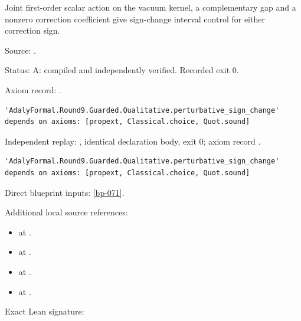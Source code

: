 \begin{theorem}[bp-325]
\label{bp-325}
\leanok
Joint first-order scalar action on the vacuum kernel, a complementary gap and a nonzero correction coefficient give sign-change interval control for either correction sign.

\par Source: \texttt{}.
\par Status: A: compiled and independently verified. Recorded exit 0.
\par Axiom record: \texttt{}.
\begin{verbatim}
'AdalyFormal.Round9.Guarded.Qualitative.perturbative_sign_change' depends on axioms: [propext, Classical.choice, Quot.sound]
\end{verbatim}
\par Independent replay: \texttt{}, identical declaration body, exit 0; axiom record \texttt{}.
\begin{verbatim}
'AdalyFormal.Round9.Guarded.Qualitative.perturbative_sign_change' depends on axioms: [propext, Classical.choice, Quot.sound]
\end{verbatim}
\par Direct blueprint inputs: \ref{bp-071}.
\par Additional local source references:
\begin{itemize}
\item \texttt{} at \texttt{}.
\item \texttt{} at \texttt{}.
\item \texttt{} at \texttt{}.
\item \texttt{} at \texttt{}.
\end{itemize}
\par Exact Lean signature:
\begin{verbatim}

\end{verbatim}
\end{theorem}
